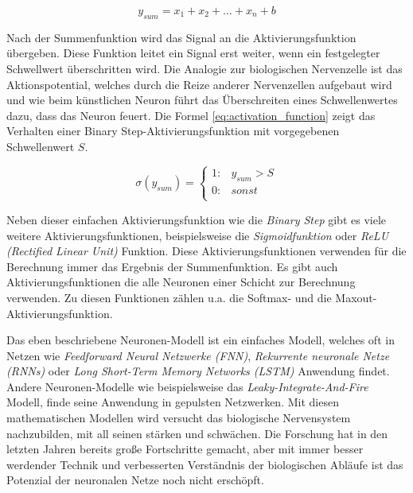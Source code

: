 \begin{equation} \label{eq:sum_function}
	y_{sum} = x_{1} + x_{2} + \dots + x_{n} + b
\end{equation}

Nach der Summenfunktion wird das Signal an die Aktivierungsfunktion übergeben. Diese Funktion leitet ein Signal erst weiter, wenn ein festgelegter Schwellwert überschritten wird. Die Analogie zur biologischen Nervenzelle ist das Aktionspotential, welches durch die Reize anderer Nervenzellen aufgebaut wird und wie beim künstlichen Neuron führt das Überschreiten eines Schwellenwertes dazu, dass das Neuron \glqq feuert\grqq. Die Formel \ref{eq:activation_function} zeigt das Verhalten einer \glqq Binary Step\grqq -Aktivierungsfunktion mit vorgegebenen Schwellenwert $S$.

\begin{equation}\label{eq:activation_function}
	\sigma (y_{sum}) = \left\{
	\begin{array}{cl}
		1: & y_{sum} > S \\
		0: & sonst \\
	\end{array}
	\right.
\end{equation}

Neben dieser einfachen Aktivierungsfunktion wie die \textit{Binary Step} gibt es viele weitere Aktivierungsfunktionen, beispielsweise die \textit{Sigmoidfunktion} oder \textit{ReLU (Rectified Linear Unit)} Funktion. Diese Aktivierungsfunktionen verwenden für die Berechnung immer das Ergebnis der Summenfunktion. Es gibt auch Aktivierungsfunktionen die alle Neuronen einer Schicht zur Berechnung verwenden. Zu diesen Funktionen zählen u.a. die Softmax- und die Maxout-Aktivierungsfunktion.\vspace{0.2cm}

Das eben beschriebene Neuronen-Modell ist ein einfaches Modell, welches oft in Netzen wie \textit{Feedforward Neural Netzwerke (FNN)}, \textit{Rekurrente neuronale Netze (RNNs)} oder \textit{Long Short-Term Memory Networks (LSTM)} Anwendung findet. Andere Neuronen-Modelle wie beispielsweise das \textit{Leaky-Integrate-And-Fire} Modell, finde seine Anwendung in gepulsten Netzwerken. Mit diesen mathematischen Modellen wird versucht das biologische Nervensystem nachzubilden, mit all seinen stärken und schwächen. Die Forschung hat in den letzten Jahren bereits große Fortschritte gemacht, aber mit immer besser werdender Technik und verbesserten Verständnis der biologischen Abläufe ist das Potenzial der neuronalen Netze noch nicht erschöpft.


